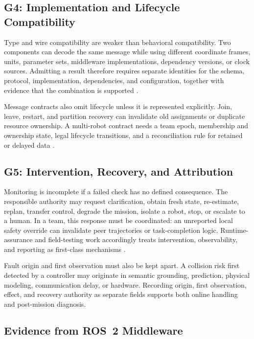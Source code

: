 \subsection{G4: Implementation and Lifecycle Compatibility}

Type and wire compatibility are weaker than behavioral compatibility.  Two
components can decode the same message while using different coordinate frames,
units, parameter sets, middleware implementations, dependency versions, or clock
sources.  Admitting a result therefore requires separate identities for the
schema, protocol, implementation, dependencies, and configuration, together with
evidence that the combination is supported
\cite{macenski2022ros2,omg2015dds,kronauer2021latency}.

Message contracts also omit lifecycle unless it is represented explicitly.
Join, leave, restart, and partition recovery can invalidate old assignments or
duplicate resource ownership.  A multi-robot contract needs a team epoch,
membership and ownership state, legal lifecycle transitions, and a
reconciliation rule for retained or delayed data
\cite{luckcuck2026compositional,liu2026phyagentos}.

\subsection{G5: Intervention, Recovery, and Attribution}

Monitoring is incomplete if a failed check has no defined consequence.  The
responsible authority may request clarification, obtain fresh state,
re-estimate, replan, transfer control, degrade the mission, isolate a robot,
stop, or escalate to a human.  In a team, this response must be coordinated: an
unreported local safety override can invalidate peer trajectories or
task-completion logic.  Runtime-assurance and field-testing work accordingly
treats intervention, observability, and reporting as first-class mechanisms
\cite{desai2019soter,shivakumar2020soterros,caldas2024rvft}.

Fault origin and first observation must also be kept apart.  A collision risk
first detected by a controller may originate in semantic grounding, prediction,
physical modeling, communication delay, or hardware.  Recording origin, first
observation, effect, and recovery authority as separate fields supports both
online handling and post-mission diagnosis.

\subsection{Evidence from ROS~2 Middleware}
\label{sec:middleware-evidence}

